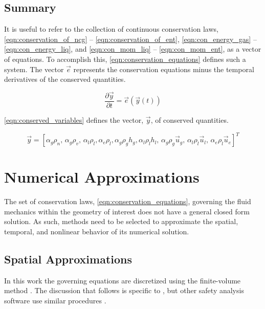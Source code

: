 \subsection{Summary}
\label{subsect:summary}

It is useful to refer to the collection of continuous conservation laws, \eqref{eqn:conservation_of_ncg} -- \eqref{eqn:conservation_of_ent}, \eqref{eqn:con_energy_gas} -- \eqref{eqn:con_energy_liq}, and \eqref{eqn:con_mom_liq} -- \eqref{eqn:con_mom_ent}, as a vector of equations.
To accomplish this, \eqref{eqn:conservation_equations} defines such a system.
The vector $\vec{e}$ represents the conservation equations minus the temporal derivatives of the conserved quantities.

\begin{equation}
\label{eqn:conservation_equations}
\frac{\partial \vec{y} }{\partial t} = \vec{e}(\vec{y}(t))
\end{equation}

\eqref{eqn:conserved_variables} defines the vector, $\vec{y}$, of conserved quantities.

\begin{equation}
\label{eqn:conserved_variables}
\vec{y} = [\alpha_g \rho_n,\, \alpha_g \rho_v,\, \alpha_l \rho_l, \alpha_e \rho_l, \alpha_g \rho_g h_g, \alpha_l \rho_l h_l,\, \alpha_g \rho_g \vec{u}_g,\, \alpha_l \rho_l \vec{u}_l,\, \alpha_e \rho_l \vec{u}_e]^{T}
\end{equation}

\section{Numerical Approximations}
\label{sect:numeric_approximation}
The set of conservation laws, \eqref{eqn:conservation_equations}, governing the fluid mechanics within the geometry of interest does not have a general closed form solution.
As such, methods need to be selected to approximate the spatial, temporal, and nonlinear behavior of its numerical solution.

\subsection{Spatial Approximations}
\label{subsect:spatial_approx}
In this work the governing equations are discretized using the finite-volume method \cite{LeVeque2002}.
The discussion that follows is specific to \cobra{}, but other safety analysis software use similar procedures \cite{RELAP,TRACE}.

